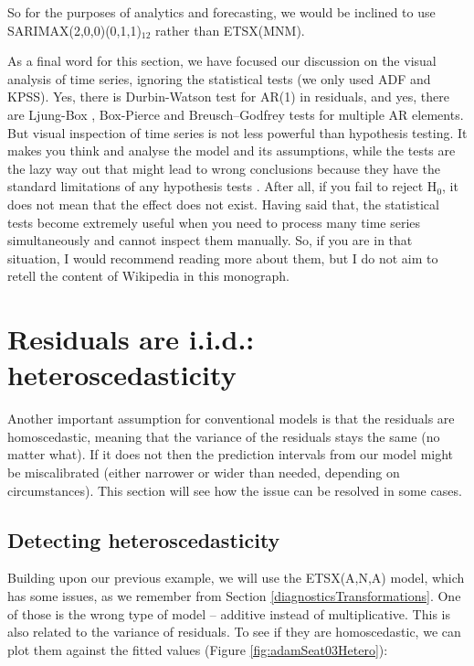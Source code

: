 \documentclass[
]{book}
\theoremstyle{definition}
\theoremstyle{definition}
\theoremstyle{definition}
\theoremstyle{definition}
\theoremstyle{remark}
\begin{document}
So for the purposes of analytics and forecasting, we would be inclined to use SARIMAX(2,0,0)(0,1,1)\(_{12}\) rather than ETSX(MNM).

As a final word for this section, we have focused our discussion on the visual analysis of time series, ignoring the statistical tests (we only used ADF and KPSS). Yes, there is Durbin-Watson \citep{WikipediaDurbinWatson2021} test for AR(1) in residuals, and yes, there are Ljung-Box \citep{WikipediaLjungBox2021}, Box-Pierce and Breusch--Godfrey \citep{WikipediaBreuschGodfrey2021} tests for multiple AR elements. But visual inspection of time series is not less powerful than hypothesis testing. It makes you think and analyse the model and its assumptions, while the tests are the lazy way out that might lead to wrong conclusions because they have the standard limitations of any hypothesis tests \citep[as discussed in Section 5.3 of][]{SvetunkovSBA}. After all, if you fail to reject H\(_0\), it does not mean that the effect does not exist. Having said that, the statistical tests become extremely useful when you need to process many time series simultaneously and cannot inspect them manually. So, if you are in that situation, I would recommend reading more about them, but I do not aim to retell the content of Wikipedia in this monograph.

\hypertarget{diagnosticsResidualsIIDHetero}{%
\section{Residuals are i.i.d.: heteroscedasticity}\label{diagnosticsResidualsIIDHetero}}

Another important assumption for conventional models is that the residuals are homoscedastic, meaning that the variance of the residuals stays the same (no matter what). If it does not then the prediction intervals from our model might be miscalibrated (either narrower or wider than needed, depending on circumstances). This section will see how the issue can be resolved in some cases.

\hypertarget{detecting-heteroscedasticity}{%
\subsection{Detecting heteroscedasticity}\label{detecting-heteroscedasticity}}

Building upon our previous example, we will use the ETSX(A,N,A) model, which has some issues, as we remember from Section \ref{diagnosticsTransformations}. One of those is the wrong type of model -- additive instead of multiplicative. This is also related to the variance of residuals. To see if they are homoscedastic, we can plot them against the fitted values (Figure \ref{fig:adamSeat03Hetero}):
\end{document}
